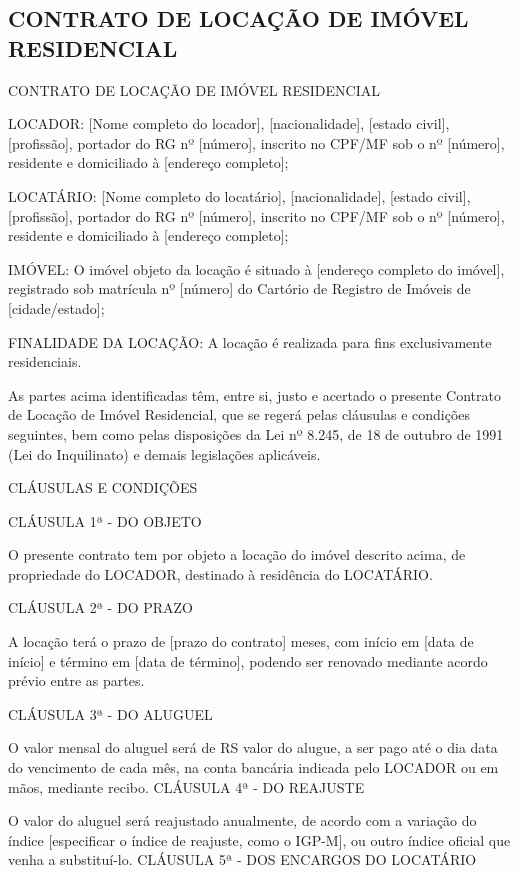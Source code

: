 \begin{anexosenv}

\chapter{CONTRATO DE LOCAÇÃO DE IMÓVEL RESIDENCIAL}

CONTRATO DE LOCAÇÃO DE IMÓVEL RESIDENCIAL

LOCADOR: [Nome completo do locador], [nacionalidade], [estado civil], [profissão], portador do RG nº [número], inscrito no CPF/MF sob o nº [número], residente e domiciliado à [endereço completo];

LOCATÁRIO: [Nome completo do locatário], [nacionalidade], [estado civil], [profissão], portador do RG nº [número], inscrito no CPF/MF sob o nº [número], residente e domiciliado à [endereço completo];

IMÓVEL: O imóvel objeto da locação é situado à [endereço completo do imóvel], registrado sob matrícula nº [número] do Cartório de Registro de Imóveis de [cidade/estado];

FINALIDADE DA LOCAÇÃO: A locação é realizada para fins exclusivamente residenciais.

As partes acima identificadas têm, entre si, justo e acertado o presente Contrato de Locação de Imóvel Residencial, que se regerá pelas cláusulas e condições seguintes, bem como pelas disposições da Lei nº 8.245, de 18 de outubro de 1991 (Lei do Inquilinato) e demais legislações aplicáveis.

CLÁUSULAS E CONDIÇÕES

CLÁUSULA 1ª - DO OBJETO

O presente contrato tem por objeto a locação do imóvel descrito acima, de propriedade do LOCADOR, destinado à residência do LOCATÁRIO.

CLÁUSULA 2ª - DO PRAZO

A locação terá o prazo de [prazo do contrato] meses, com início em [data de início] e término em [data de término], podendo ser renovado mediante acordo prévio entre as partes.

CLÁUSULA 3ª - DO ALUGUEL

O valor mensal do aluguel será de RS valor do alugue, a ser pago até o dia data do vencimento de cada mês, na conta bancária indicada pelo LOCADOR ou em mãos, mediante recibo.
CLÁUSULA 4ª - DO REAJUSTE

O valor do aluguel será reajustado anualmente, de acordo com a variação do índice [especificar o índice de reajuste, como o IGP-M], ou outro índice oficial que venha a substituí-lo.
CLÁUSULA 5ª - DOS ENCARGOS DO LOCATÁRIO


\end{anexosenv}
